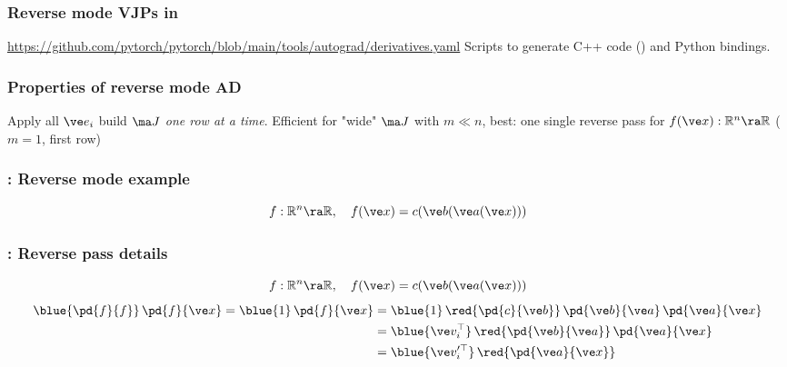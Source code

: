\documentclass[fleqn,10pt]{beamer}
\begin{document}
\begin{frame}
    \frametitle{Reverse mode VJPs in \pytorch}
    \url{https://github.com/pytorch/pytorch/blob/main/tools/autograd/derivatives.yaml}
    Scripts to generate C++ code () and Python bindings.
\end{frame}

\begin{frame}
    \frametitle{Properties of reverse mode AD}
    Apply all $\ve e_i$ \ra build $\ma J$ \emph{one row at a time}.
    Efficient for "wide" $\ma J$ with $m\ll n$, best: one single reverse pass for $f(\ve x): \mathbb R^n \ra \mathbb R$ ($m=1$, first row)
    \edgerow
\end{frame}

\begin{frame}
    \frametitle{\pytorch: Reverse mode example}
    \begin{equation*}
        f: \mathbb R^n\ra \mathbb R, \quad f(\ve x) = c(\ve b(\ve a(\ve x)))
    \end{equation*}
\end{frame}

\begin{frame}
    \frametitle{\pytorch: Reverse pass details}
    \begin{equation*}
        f: \mathbb R^n\ra \mathbb R, \quad f(\ve x) = c(\ve b(\ve a(\ve x)))
    \end{equation*}
    \begin{align*}
        \blue{\pd{f}{f}}\,\pd{f}{\ve x} = \blue{1}\,\pd{f}{\ve x}
            &= \blue{1}\,            \red{\pd{c}{\ve b}}\,\pd{\ve b}{\ve a}\,\pd{\ve a}{\ve x}\\
            &= \blue{\ve v_i^\top}\, \red{\pd{\ve b}{\ve a}}\,\pd{\ve a}{\ve x}\\
            &= \blue{\ve v_i'^\top}\,\red{\pd{\ve a}{\ve x}}
    \end{align*}
\end{frame}
\end{document}

